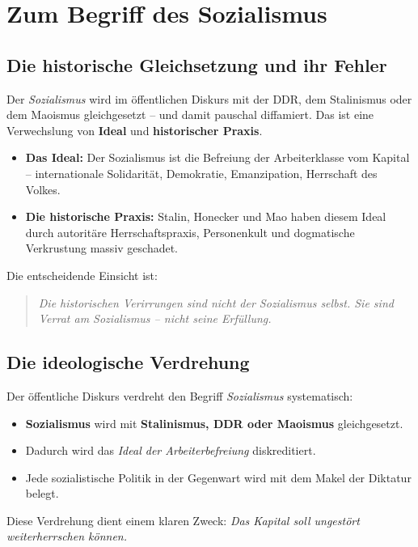 \section{Zum Begriff des Sozialismus}

\subsection{Die historische Gleichsetzung und ihr Fehler}

Der \emph{Sozialismus} wird im öffentlichen Diskurs mit der DDR, dem Stalinismus oder dem Maoismus gleichgesetzt – und damit pauschal diffamiert. Das ist eine Verwechslung von \textbf{Ideal} und \textbf{historischer Praxis}.

\begin{itemize}
    \item \textbf{Das Ideal:} Der Sozialismus ist die Befreiung der Arbeiterklasse vom Kapital – internationale Solidarität, Demokratie, Emanzipation, Herrschaft des Volkes.
    \item \textbf{Die historische Praxis:} Stalin, Honecker und Mao haben diesem Ideal durch autoritäre Herrschaftspraxis, Personenkult und dogmatische Verkrustung massiv geschadet.
\end{itemize}

Die entscheidende Einsicht ist:

\begin{quote}
\emph{Die historischen Verirrungen sind nicht der Sozialismus selbst. Sie sind Verrat am Sozialismus – nicht seine Erfüllung.}
\end{quote}

\subsection{Die ideologische Verdrehung}

Der öffentliche Diskurs verdreht den Begriff \emph{Sozialismus} systematisch:

\begin{itemize}
    \item \textbf{Sozialismus} wird mit \textbf{Stalinismus, DDR oder Maoismus} gleichgesetzt.
    \item Dadurch wird das \emph{Ideal der Arbeiterbefreiung} diskreditiert.
    \item Jede sozialistische Politik in der Gegenwart wird mit dem Makel der Diktatur belegt.
\end{itemize}

Diese Verdrehung dient einem klaren Zweck: \emph{Das Kapital soll ungestört weiterherrschen können.}

